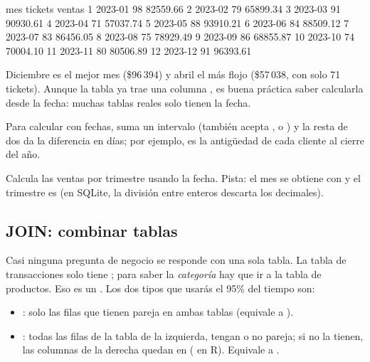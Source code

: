 \begin{rsalida}
       mes tickets   ventas
1  2023-01      98 82559.66
2  2023-02      79 65899.34
3  2023-03      91 90930.61
4  2023-04      71 57037.74
5  2023-05      88 93910.21
6  2023-06      84 88509.12
7  2023-07      83 86456.05
8  2023-08      75 78929.49
9  2023-09      86 68855.87
10 2023-10      74 70004.10
11 2023-11      80 80506.89
12 2023-12      91 96393.61
\end{rsalida}

Diciembre es el mejor mes (\$96\,394) y abril el más flojo (\$57\,038, con
solo 71 tickets). Aunque la tabla ya trae una columna , es
buena práctica saber calcularla desde la fecha: muchas tablas reales solo
tienen la fecha.

Para calcular con fechas,  suma un intervalo
(también acepta ,  o
) y la resta de dos  da la
diferencia en días; por ejemplo,
 es la
antigüedad de cada cliente al cierre del año.

\begin{hazlotu}
Calcula las ventas por trimestre usando la fecha. Pista: el mes se obtiene
con  y el trimestre es
 (en SQLite, la división entre enteros descarta los
decimales).
\end{hazlotu}

\subsection{JOIN: combinar tablas}

Casi ninguna pregunta de negocio se responde con una sola tabla. La tabla de
transacciones solo tiene ; para saber la
\emph{categoría} hay que ir a la tabla de productos. Eso es un
. Los dos tipos que usarás el 95\% del tiempo son:

\begin{itemize}
  \item {}: solo las filas que tienen pareja en ambas
        tablas (equivale a ).
  \item {}: todas las filas de la tabla de la izquierda,
        tengan o no pareja; si no la tienen, las columnas de la derecha
        quedan en  ( en R). Equivale a
        .
\end{itemize}

